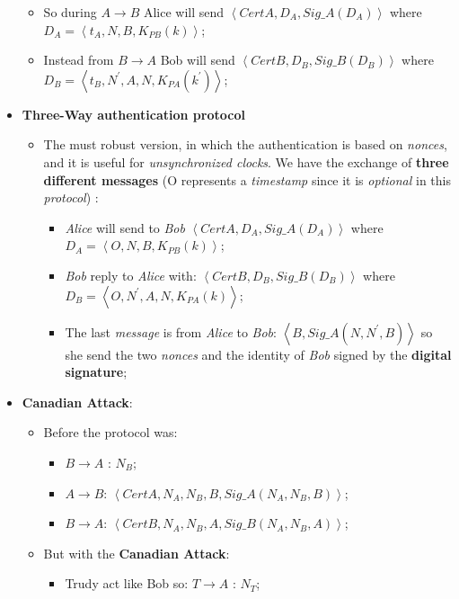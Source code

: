 \documentclass{article}
\begin{document}
\begin{itemize}
\begin{itemize}
\item So during $A \rightarrow B$ Alice will send $\left \langle CertA, D_A, Sig\_A(D_A) \right \rangle$ where $D_A = \left \langle t_A, N, B, K_{PB}(k) \right \rangle$;
\item Instead from $B \rightarrow A$ Bob will send  $\left \langle CertB, D_B, Sig\_B(D_B) \right \rangle$ where $D_B = \left \langle t_B, N^{'}, A, N, K_{PA}(k^{'}) \right \rangle$;
\end{itemize}
\item \textbf{Three-Way authentication protocol}
\begin{itemize}
\item The must robust version, in which the authentication is based on \emph{nonces}, and it is useful for \emph{unsynchronized clocks}. We have the exchange of \textbf{three different messages} (O represents a \emph{timestamp} since it is \emph{optional} in this \emph{protocol}) :
\begin{itemize}
\item \emph{Alice} will send to \emph{Bob} $\left \langle CertA, D_A, Sig\_A(D_A) \right \rangle$ where $D_A =  \left \langle O, N, B, K_{PB}(k) \right \rangle$;
\item \emph{Bob} reply to \emph{Alice} with: $\left \langle CertB, D_B, Sig\_B(D_B) \right \rangle$ where $D_B = \left \langle O, N^{'}, A, N, K_{PA}(k) \right \rangle$;
\item The last \emph{message} is from \emph{Alice} to \emph{Bob}: $\left \langle B, Sig\_A(N, N^{'}, B) \right \rangle$ so she send the two \emph{nonces} and the identity of \emph{Bob} signed by the \textbf{digital signature};
\end{itemize}
\end{itemize}
\item \textbf{Canadian Attack}:
\begin{itemize}
\item Before the protocol was: 
\begin{itemize}
\item $B \rightarrow A$ : $N_B$;
\item $A \rightarrow B$: $\left \langle CertA, N_A, N_B, B, Sig\_A(N_A,N_B,B) \right \rangle$;
\item $B \rightarrow A$: $\left \langle CertB, N_A, N_B, A, Sig\_B(N_A,N_B,A) \right \rangle$;
\end{itemize}
\item But with the \textbf{Canadian Attack}:
\begin{itemize}
\item Trudy act like Bob so: $T \rightarrow A$ : $N_T$;

\end{itemize}
\end{itemize}
\end{itemize}
\end{document}
